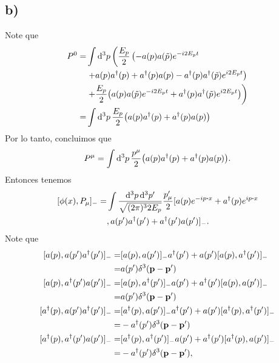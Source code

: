 \documentclass{article}
\begin{document}
\subsection*{b)}
Note que
\begin{align}
\begin{split}
P^0=&\int\dd[3]{p}\left(\frac{E_p}{2}\left(-a(p)a(\tilde{p})e^{-i2E_pt}\right.\right.\\
&\left.+a(p)a^\dagger(p)+a^\dagger(p)a(p)-a^\dagger(p)a^\dagger(\tilde{p})e^{i2E_pt}\right)\\
&\left.+\frac{E_p}{2}\qty( a(p)a(\tilde{p})e^{-i2E_pt}+a^\dagger(p)a^\dagger(\tilde{p})e^{i2E_pt})\right)\\
=&\int\dd[3]{p}\frac{E_p}{2}\qty(a(p)a^\dagger(p)+a^\dagger(p)a(p))
\end{split}
\end{align}
Por lo tanto, concluimos que
\begin{equation}
P^\mu=\int\dd[3]{p}\frac{p^\mu}{2}\qty(a(p)a^\dagger(p)+a^\dagger(p)a(p)).
\end{equation}
Entonces tenemos
\begin{align}
\begin{split}
[\phi(x),P_\mu]_-=&\int\frac{\dd[3]{p}\dd[3]{p'}}{\sqrt{(2\pi)^32E_p}}\frac{p'_\mu}{2}[a(p)e^{-ip\vdot x}+a^\dagger(p)e^{ip\vdot x}\\
&,a(p')a^\dagger(p')+a^\dagger(p')a(p')]_-.
\end{split}
\end{align}
Note que
\begin{align}\label{ec:conmutador_productos}
\begin{split}
[a(p),a(p')a^\dagger(p')]_-=&[a(p),a(p')]_-a^\dagger(p')+a(p')[a(p),a^\dagger(p')]_-\\
=&a(p')\delta^3(\vb{p}-\vb{p'})\\
[a(p),a^\dagger(p')a(p')]_-=&[a(p),a^\dagger(p')]_-a(p')+a^\dagger(p')[a(p),a(p')]_-\\
=&a(p')\delta^3(\vb{p}-\vb{p'})\\
[a^\dagger(p),a(p')a^\dagger(p')]_-=&[a^\dagger(p),a(p')]_-a^\dagger(p')+a(p')[a^\dagger(p),a^\dagger(p')]_-\\
=&-a^\dagger(p')\delta^3(\vb{p}-\vb{p'})\\
[a^\dagger(p),a^\dagger(p')a(p')]_-=&[a^\dagger(p),a^\dagger(p')]_-a(p')+a^\dagger(p')[a^\dagger(p),a(p')]_-\\
=&-a^\dagger(p')\delta^3(\vb{p}-\vb{p'}),
\end{split}
\end{align}
\end{document}
